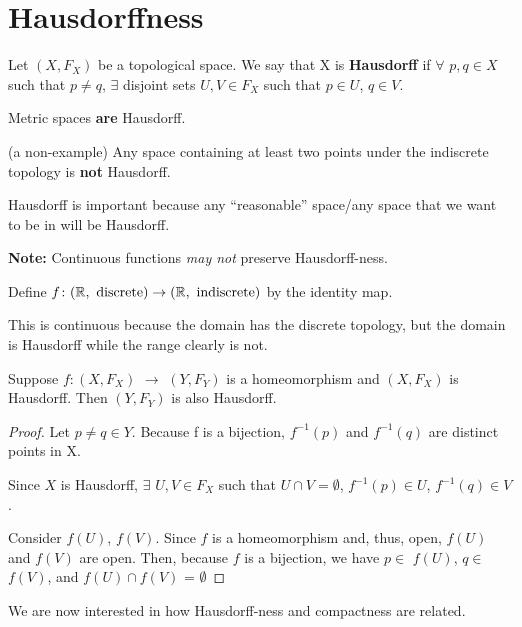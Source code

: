 

\section{Hausdorffness}
\begin{definition}
	Let $(X, F _X)$ be a topological space. We say that X is {\bf Hausdorff} if $\forall$ $p, q \in X$ such that $p \neq q$, $\exists$ disjoint sets $U, V \in F_X$ such that $p \in U$, $q \in V$. 
\end{definition}
\begin{example}
	Metric spaces \textbf{are} Hausdorff. 
\end{example}
\begin{example}
	(a non-example) Any space containing at least two points under the indiscrete topology is \textbf{not} Hausdorff. 
\end{example}

Hausdorff is important because any ``reasonable'' space/any space that we want to be in will be Hausdorff.

\textbf{Note:} Continuous functions \emph{may not} preserve Hausdorff-ness.
\begin{example}
	Define $f\colon(\mathbb R,\text{ discrete})\to (\mathbb R,\text{ indiscrete})$ by the identity map. 
\end{example}

This is continuous because the domain has the discrete topology, but the domain is Hausdorff while the range clearly is not.
\begin{smallfact}
	Suppose $f \colon (X, F_X)$ $\to$ $(Y, F_Y)$ is a homeomorphism and $(X, F_X)$ is Hausdorff. Then $(Y, F_Y)$ is also Hausdorff. 
\end{smallfact}
\begin{proof}
	Let $p \neq q \in Y$. Because f is a bijection, $f^{-1}(p)$ and $f^{-1}(q)$ are distinct points in X.
	
	Since $X$ is Hausdorff, $\exists$ $U, V \in F_X$ such that $U \cap V = \emptyset$, $f^{-1}(p) \in U$, $f^{-1}(q) \in V$.
	
	Consider $f(U)$, $f(V)$. Since $f$ is a homeomorphism and, thus, open, $f(U)$ and $f(V)$ are open. Then, because $f$ is a bijection, we have $p \in$ $f(U)$, $q \in$ $f(V)$, and $f(U) \cap f(V)$ = $\emptyset$ 
\end{proof}

We are now interested in how Hausdorff-ness and compactness are related.\\

